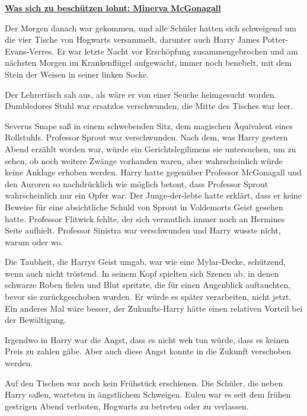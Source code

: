 

\hypertarget{was-sich-zu-beschuxfctzen-lohnt-minerva-mcgonagall}{%

\textbf{\uline{Was sich zu beschützen lohnt: Minerva McGonagall}}

Der Morgen danach war gekommen, und alle Schüler hatten sich schweigend um die vier Tische von Hogwarts versammelt, darunter auch Harry James Potter-Evans-Verres. Er war letzte Nacht vor Erschöpfung zusammengebrochen und am nächsten Morgen im Krankenflügel aufgewacht, immer noch benebelt, mit dem Stein der Weisen in seiner linken Socke.

Der Lehrertisch sah aus, als wäre er von einer Seuche heimgesucht worden. Dumbledores Stuhl war ersatzlos verschwunden, die Mitte des Tisches war leer.

Severus Snape saß in einem schwebenden Sitz, dem magischen Äquivalent eines Rollstuhls. Professor Sprout war verschwunden. Nach dem, was Harry gestern Abend erzählt worden war, würde ein Gerichtslegilimens sie untersuchen, um zu sehen, ob noch weitere Zwänge vorhanden waren, aber wahrscheinlich würde keine Anklage erhoben werden. Harry hatte gegenüber Professor McGonagall und den Auroren so nachdrücklich wie möglich betont, dass Professor Sprout wahrscheinlich nur ein Opfer war. Der Junge-der-lebte hatte erklärt, dass er keine Beweise für eine absichtliche Schuld von Sprout in Voldemorts Geist gesehen hatte. Professor Flitwick fehlte, der sich vermutlich immer noch an Hermines Seite aufhielt. Professor Sinistra war verschwunden und Harry wusste nicht, warum oder wo.

Die Taubheit, die Harrys Geist umgab, war wie eine Mylar-Decke, schützend, wenn auch nicht tröstend. In seinem Kopf spielten sich Szenen ab, in denen schwarze Roben fielen und Blut spritzte, die für einen Augenblick auftauchten, bevor sie zurückgeschoben wurden. Er würde es später verarbeiten, nicht jetzt. Ein anderes Mal wäre besser, der Zukunfts-Harry hätte einen relativen Vorteil bei der Bewältigung.

Irgendwo in Harry war die Angst, dass es nicht weh tun würde, dass es keinen Preis zu zahlen gäbe. Aber auch diese Angst konnte in die Zukunft verschoben werden.

Auf den Tischen war noch kein Frühstück erschienen. Die Schüler, die neben Harry saßen, warteten in ängstlichem Schweigen. Eulen war es seit dem frühen gestrigen Abend verboten, Hogwarts zu betreten oder zu verlassen.

}
